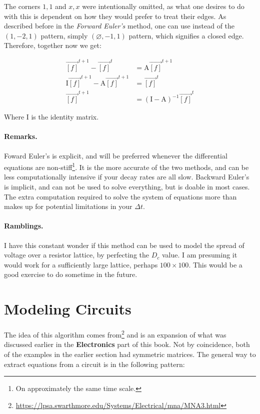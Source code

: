 The corners $1,1$ and $x,x$ were intentionally omitted, as what one desires to do with this is dependent on how they would prefer to treat their edges. As described before in the \textit{Forward Euler's} method, one can use instead of the $(1,-2,1)$ pattern, simply $(\varnothing,-1,1)$ pattern, which signifies a closed edge. Therefore, together now we get: 

\begin{equation} \label{diff7}
\begin{split}
\vec{[f]}^{t+1} - \vec{[f]}^{t} & = \mathrm{A} \vec{[f]}^{t+1} \\
\mathrm{I}\vec{[f]}^{t+1} - \mathrm{A}\vec{[f]}^{t+1} & = \vec{[f]}^{t} \\
\vec{[f]}^{t+1} & = (\mathrm{I} - \mathrm{A})^{-1}\vec{[f]}^{t}
\end{split}
\end{equation}

Where I is the identity matrix. 

\subsubsection{Remarks.} 
Foward Euler's is explicit, and will be preferred whenever the differential equations are non-stiff\footnote{On approximately the same time scale.}. It is the more accurate of the two methods, and can be less computationally intensive if your decay rates are all slow. Backward Euler's is implicit, and can not be used to solve everything, but is doable in most cases. The extra computation required to solve the system of equations more than makes up for potential limitations in your $\Delta t$. 

\subsubsection{Ramblings.} 
I have this constant wonder if this method can be used to model the spread of voltage over a resistor lattice, by perfecting the $D_c$ value. I am presuming it would work for a sufficiently large lattice, perhaps $100 \times 100$. This would be a good exercise to do sometime in the future. 



\chapter{Modeling Circuits}
\label{Modeling Circuits}

The idea of this algorithm comes from\footnote{\url{https://lpsa.swarthmore.edu/Systems/Electrical/mna/MNA3.html}} and is an expansion of what was discussed earlier in the \textbf{Electronics} part of this book. Not by coincidence, both of the examples in the earlier section had symmetric matrices. The general way to extract equations from a circuit is in the following pattern:   

